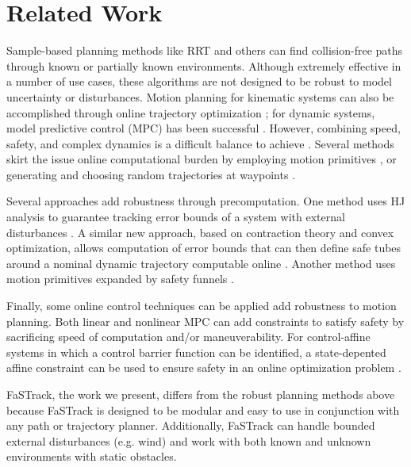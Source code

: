 \section{Related Work \label{sec:relatedwork}}
Sample-based planning methods like RRT \cite{Kuffner2000} and others \cite{Kavraki1996,Janson2015,Richter2016, Karaman2011, Kobilarov2012} can find collision-free paths through known or partially known environments. Although extremely effective in a number of use cases, these algorithms are not designed to be robust to model uncertainty or disturbances. Motion planning for kinematic systems can also be accomplished through online trajectory optimization \cite{Schulman2013,Ratliff2009}; for dynamic systems, model predictive control (MPC) has been successful \cite{Qin2003}. However, combining speed, safety, and complex dynamics is a difficult balance to achieve \cite{Vitus2008, Zeilinger2011, Richter2012}. Several methods skirt the issue online computational burden by employing motion primitives \cite{Gillula2010, Dey2016}, or generating and choosing random trajectories at waypoints \cite{Kalakrishnan2011, Schwesinger2013}. 


Several approaches add robustness through precomputation. One method uses HJ analysis to guarantee tracking error bounds of a system with external disturbances \cite{Bansal2017}. A similar new approach, based on contraction theory and convex optimization, allows computation of error bounds that can then define safe tubes around a nominal dynamic trajectory computable online \cite{Singh2017}.  Another method uses motion primitives expanded by safety funnels \cite{Majumdar2017}.

Finally, some online control techniques can be applied add robustness to motion planning. Both linear and nonlinear MPC can add constraints to satisfy safety \cite{Richards2006, DiCairano2016,Hoy2015} by sacrificing speed of computation and/or maneuverability. For control-affine systems in which a control barrier function can be identified, a state-depented affine constraint can be used to ensure safety in an online optimization problem \cite{Ames2014}.

FaSTrack, the work we present, differs from the robust planning methods above because FaSTrack is designed to be modular and easy to use in conjunction with any path or trajectory planner. Additionally, FaSTrack can handle bounded external disturbances (e.g. wind) and work with both known and unknown environments with static obstacles.